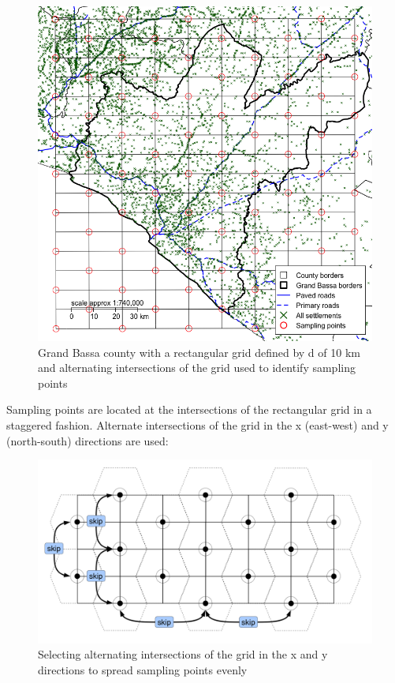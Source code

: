 \documentclass[12pt,a4paper]{book}
\theoremstyle{definition}
\theoremstyle{definition}
\theoremstyle{definition}
\theoremstyle{remark}
\begin{document}
\newpage

\begin{figure}[H]

{\centering \includegraphics{figures/grid2a-1} 

}

\caption{Grand Bassa county with a rectangular grid defined by d of 10 km and alternating intersections of the grid used to identify sampling points}\label{fig:grid2a}
\end{figure}

Sampling points are located at the intersections of the rectangular grid
in a staggered fashion. Alternate intersections of the grid in the x
(east-west) and y (north-south) directions are used:

\newpage

\begin{figure}[H]

{\centering \includegraphics[width=21.46in]{figures/grid2a} 

}

\caption{Selecting alternating intersections of the grid in the x and y directions to spread sampling points evenly}\label{fig:grid2b}
\end{figure}
\end{document}
